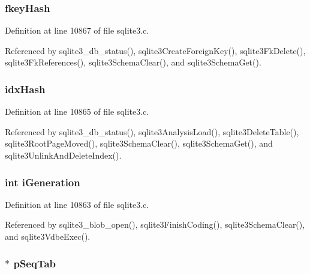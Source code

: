\subsubsection[{fkey\+Hash}]{ fkey\+Hash}\label{struct_schema_af04ec7c35bed826152f53e5690b2cbf1}


Definition at line 10867 of file sqlite3.\+c.



Referenced by sqlite3\+\_\+db\+\_\+status(), sqlite3\+Create\+Foreign\+Key(), sqlite3\+Fk\+Delete(), sqlite3\+Fk\+References(), sqlite3\+Schema\+Clear(), and sqlite3\+Schema\+Get().

\hypertarget{struct_schema_ae4ced04fecd92a71adb8e64a4de17541}{}
\subsubsection[{idx\+Hash}]{ idx\+Hash}\label{struct_schema_ae4ced04fecd92a71adb8e64a4de17541}


Definition at line 10865 of file sqlite3.\+c.



Referenced by sqlite3\+\_\+db\+\_\+status(), sqlite3\+Analysis\+Load(), sqlite3\+Delete\+Table(), sqlite3\+Root\+Page\+Moved(), sqlite3\+Schema\+Clear(), sqlite3\+Schema\+Get(), and sqlite3\+Unlink\+And\+Delete\+Index().

\hypertarget{struct_schema_a609e1623fdce8c8ab1d6b772fa881d96}{}
\subsubsection[{i\+Generation}]{\setlength{\rightskip}{0pt plus 5cm}int i\+Generation}\label{struct_schema_a609e1623fdce8c8ab1d6b772fa881d96}


Definition at line 10863 of file sqlite3.\+c.



Referenced by sqlite3\+\_\+blob\+\_\+open(), sqlite3\+Finish\+Coding(), sqlite3\+Schema\+Clear(), and sqlite3\+Vdbe\+Exec().

\hypertarget{struct_schema_ae178bc4bdd3ca5ffe4351c10d96950f3}{}
\subsubsection[{p\+Seq\+Tab}]{$\ast$ p\+Seq\+Tab}\label{struct_schema_ae178bc4bdd3ca5ffe4351c10d96950f3}


